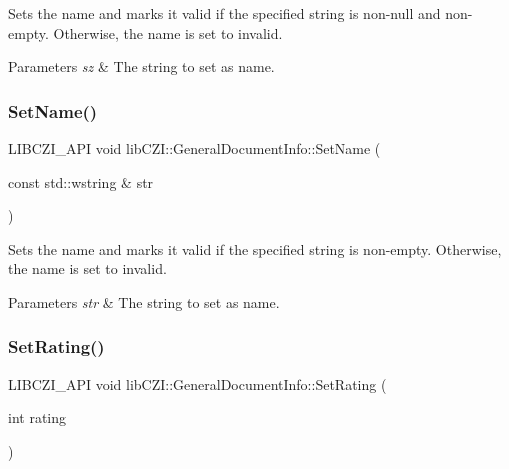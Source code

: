 Sets the name and marks it valid if the specified string is non-\/null and non-\/empty. Otherwise, the name is set to invalid.


\begin{DoxyParams}{Parameters}
{\em sz} & The string to set as name. \\
\hline
\end{DoxyParams}
\mbox{\label{structlib_c_z_i_1_1_general_document_info_a8dde64dffbd8d98ec31e4b91708280ae}} 
\subsubsection{\texorpdfstring{Set\+Name()}{SetName()}\hspace{0.1cm}{\footnotesize\ttfamily [2/2]}}
{\footnotesize\ttfamily L\+I\+B\+C\+Z\+I\+\_\+\+A\+PI void lib\+C\+Z\+I\+::\+General\+Document\+Info\+::\+Set\+Name (\begin{DoxyParamCaption}\item[{const std\+::wstring \&}]{str }\end{DoxyParamCaption})\hspace{0.3cm}{\ttfamily [inline]}}

Sets the name and marks it valid if the specified string is non-\/empty. Otherwise, the name is set to invalid.


\begin{DoxyParams}{Parameters}
{\em str} & The string to set as name. \\
\hline
\end{DoxyParams}
\mbox{\label{structlib_c_z_i_1_1_general_document_info_a892af777dee6758526e13c6e9aff6795}} 
\subsubsection{\texorpdfstring{Set\+Rating()}{SetRating()}}
{\footnotesize\ttfamily L\+I\+B\+C\+Z\+I\+\_\+\+A\+PI void lib\+C\+Z\+I\+::\+General\+Document\+Info\+::\+Set\+Rating (\begin{DoxyParamCaption}\item[{int}]{rating }\end{DoxyParamCaption})\hspace{0.3cm}{\ttfamily [inline]}}

